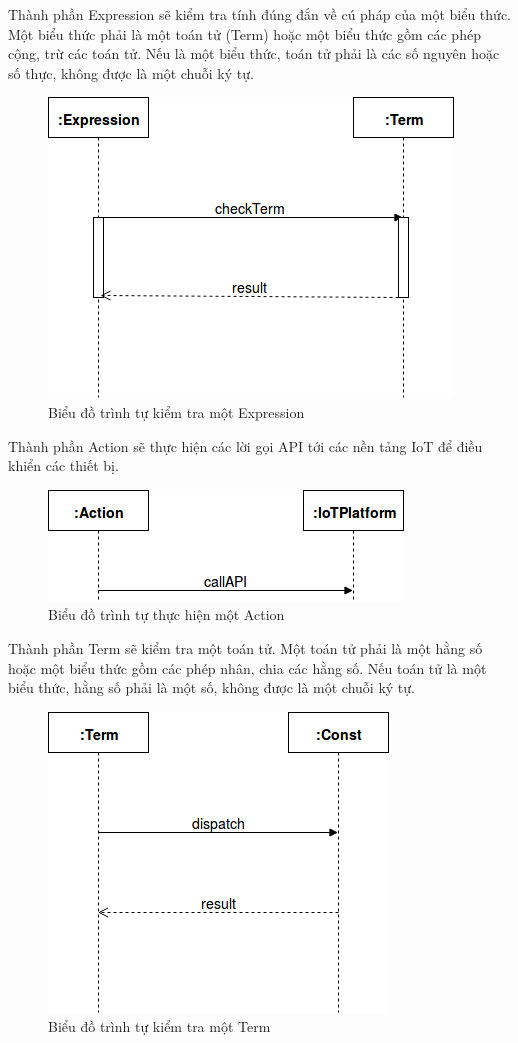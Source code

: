 Thành phần Expression sẽ kiểm tra tính đúng đắn về cú pháp của một biểu thức. Một biểu thức phải là một toán tử (Term) hoặc một biểu thức gồm các phép cộng, trừ các toán tử. Nếu là một biểu thức, toán tử phải là các số nguyên hoặc số thực, không được là một chuỗi ký tự.

\clearpage
\begin{figure}[h!]
	\center
	\includegraphics[scale=0.4]{image/language_diagram-expression}	
	\caption{Biểu đồ trình tự kiểm tra một Expression}
\end{figure}

Thành phần Action sẽ thực hiện các lời gọi API tới các nền tảng IoT để điều khiển các thiết bị.

\begin{figure}[h!]
	\center
	\includegraphics[scale=0.4]{image/language_diagram-action}	
	\caption{Biểu đồ trình tự thực hiện một Action}
\end{figure}

Thành phần Term sẽ kiểm tra một toán tử. Một toán tử phải là một hằng số hoặc một biểu thức gồm các phép nhân, chia các hằng số. Nếu toán tử là một biểu thức, hằng số phải là một số, không được là một chuỗi ký tự.

\begin{figure}[h!]
	\center
	\includegraphics[scale=0.4]{image/language_diagram-term}	
	\caption{Biểu đồ trình tự kiểm tra một Term}
\end{figure}


